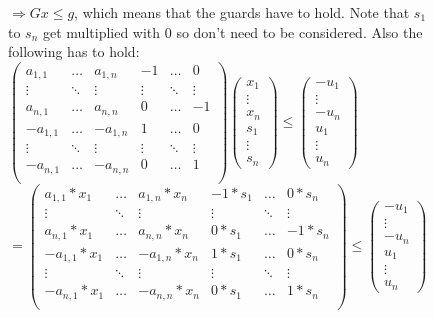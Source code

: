 \begin{figure}[H]
	\vspace*{1em}
	$\Rightarrow Gx\le g$, which means that the guards have to hold. Note that $s_1$ to $s_n$ get multiplied with 0 so don't need to be considered. Also the following has to hold: \newline
	\vspace*{1em}
	\hspace*{1em}
	$\begin{pmatrix}
	a_{1,1}  & \dots 	& a_{1,n}	& -1 	 & \dots  & 0 \\
	\vdots   & \ddots 	& \vdots	& \vdots & \ddots & \vdots \\
	a_{n,1}  & \dots 	& a_{n,n}	& 0 	 & \dots  & -1 \\
	-a_{1,1} & \dots 	& -a_{1,n}	& 1 	 & \dots  & 0 \\
	\vdots   & \ddots 	& \vdots	& \vdots & \ddots & \vdots \\
	-a_{n,1} & \dots 	& -a_{n,n}	& 0 	 & \dots  & 1 \\
	\end{pmatrix} \begin{pmatrix} x_1 \\ \vdots \\ x_n \\ s_1 \\ \vdots \\ s_n\end{pmatrix} \le \begin{pmatrix} -u_1 \\ \vdots\\ -u_n \\ u_1 \\ \vdots \\ u_n \end{pmatrix}$ \newline
	$= \begin{pmatrix}
	a_{1,1}*x_1  & \dots 	& a_{1,n}*x_n	& -1*s_1 & \dots  & 0*s_n \\
	\vdots   	 & \ddots 	& \vdots		& \vdots & \ddots & \vdots \\
	a_{n,1}*x_1  & \dots 	& a_{n,n}*x_n	& 0*s_1	 & \dots  & -1*s_n \\
	-a_{1,1}*x_1 & \dots 	& -a_{1,n}*x_n	& 1*s_1	 & \dots  & 0*s_n \\
	\vdots   	 & \ddots 	& \vdots		& \vdots & \ddots & \vdots \\
	-a_{n,1}*x_1 & \dots 	& -a_{n,n}*x_n	& 0*s_1	 & \dots  & 1*s_n \\
	\end{pmatrix} \le \begin{pmatrix} -u_1 \\ \vdots\\ -u_n \\ u_1 \\ \vdots \\ u_n \end{pmatrix}$\\

\end{figure}
